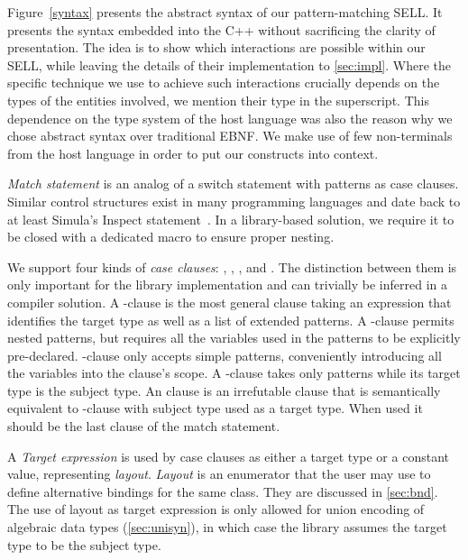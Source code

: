 Figure~\ref{syntax} presents the abstract syntax of our pattern-matching SELL. It presents 
the syntax embedded into the C++ without sacrificing 
the clarity of presentation. The idea is to show which interactions are possible 
within our SELL, while leaving the details of their implementation to 
\textsection\ref{sec:impl}. Where the specific technique we use to achieve such 
interactions crucially depends on the types of the entities involved,
we mention their type in the superscript. This dependence on the 
type system of the host language was also the reason why we chose abstract 
syntax over traditional EBNF. We make use 
of few non-terminals from the host language in order to put our constructs into 
context.

\emph{Match statement} is an analog of a switch statement with patterns as case 
clauses. Similar control structures exist in many programming languages and 
date back to at least Simula's Inspect statement~\cite{Simula67}.
In a library-based solution, we require it to be closed with a dedicated 
 macro to ensure proper nesting.

We support four kinds of \emph{case clauses}: , , 
, and .
The distinction between them is only important for the library 
implementation and can trivially be inferred in a compiler solution.
A -clause is the most general clause taking an  
expression that identifies the target type as well as a list of extended 
patterns.
A -clause permits nested patterns, but requires all the 
variables used in the patterns to be explicitly pre-declared. -clause 
only accepts simple patterns, conveniently introducing all the variables into the 
clause's scope. 
A -clause takes only patterns while its target type is 
the subject type.
An  clause is an irrefutable clause that is 
semantically equivalent to -clause with subject type used as a target 
type. When used it should be the last clause of the match statement.

A \emph{Target expression} is used by case clauses as either a target type or 
a constant value, representing \emph{layout}. \emph{Layout} is an enumerator 
that the user may use to define alternative bindings for the same class. They are 
discussed in \textsection\ref{sec:bnd}. The use of layout as target 
expression is only allowed for union encoding of algebraic data types 
(\textsection\ref{sec:unisyn}), in which case the library assumes the target 
type to be the subject type.

